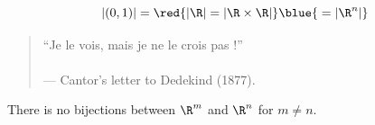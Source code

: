 \begin{frame}{}
  \begin{theorem}[$|\R|$ (Cantor 1877)]
    \[
      |(0,1)| = \red{|\R| = |\R \times \R|} \blue{\;= |\R^{n}|}
    \]
  \end{theorem}

  \vspace{0.60cm}
  \begin{quote}
    \begin{center}
      ``Je le vois, mais je ne le crois pas !'' \\[4pt]
       \\[5pt]
      \hfill --- Cantor's letter to Dedekind (1877).
    \end{center}
  \end{quote}

  \pause
  \begin{center}
    {}
  \end{center}

  \pause
  \begin{theorem}
    There is no  bijections between $\R^m$ and $\R^n$ for $m \neq n$.
  \end{theorem}
\end{frame}

